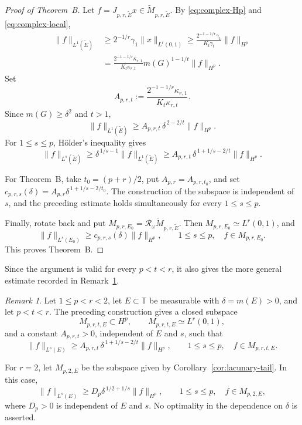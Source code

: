 \documentclass[11pt, reqno]{amsart}
\theoremstyle{definition}
\theoremstyle{remark}
\newtheorem{remark}[theorem]{Remark}
\newcommand{\T}{\mathbb{T}}
\begin{document}
\begin{proof}[Proof of Theorem~B]
Let \(f=J_{p,r,\widetilde E}x\in
\widetilde M_{p,r,\widetilde E}\).  By
\eqref{eq:complex-Hp} and
\eqref{eq:complex-local},
\[
\begin{aligned}
        \|f\|_{L^1(\widetilde E)}
        &\ge
        2^{-1/r}\gamma_1\|x\|_{L^r(0,1)}\ge
        \frac{2^{-1-1/r}\gamma_1}
             {K_t\gamma_t}
        \|f\|_{H^p}\\
        &=
        \frac{2^{-1-1/r}\kappa_{r,1}}
             {K_t\kappa_{r,t}}
        m(G)^{1-1/t}\|f\|_{H^p}.
\end{aligned}
\]
Set
\[
        A_{p,r,t}
        :=
        \frac{2^{-1-1/r}\kappa_{r,1}}
             {K_t\kappa_{r,t}}.
\]
Since \(m(G)\ge\delta^2\) and \(t>1\),
\[
        \|f\|_{L^1(\widetilde E)}
        \ge
        A_{p,r,t}\,\delta^{\,2-2/t}\|f\|_{H^p}.
\]
For \(1\le s\le p\), H\"older's inequality gives
\[
        \|f\|_{L^s(\widetilde E)}
        \ge
        \delta^{\,1/s-1}\|f\|_{L^1(\widetilde E)}  \ge
        A_{p,r,t}\,
        \delta^{\,1+1/s-2/t}\|f\|_{H^p}.
\]

For Theorem~B, take \(t_0=(p+r)/2\), put
\(A_{p,r}=A_{p,r,t_0}\), and set
\(c_{p,r,s}(\delta)
=A_{p,r}\delta^{\,1+1/s-2/t_0}\).
The construction of the subspace is independent of \(s\), and the
preceding estimate holds simultaneously for every \(1\le s\le p\).

Finally, rotate back and put
\(M_{p,r,E_0}
=\mathcal R_\omega\widetilde M_{p,r,\widetilde E}\).
Then \(M_{p,r,E_0}\simeq L^r(0,1)\), and
\[
        \|f\|_{L^s(E_0)}
        \ge
        c_{p,r,s}(\delta)\|f\|_{H^p},
        \qquad
        1\le s\le p,\quad
        f\in M_{p,r,E_0}.
\]
This proves Theorem~B.
\end{proof}


 Since the argument is valid for every
\(p<t<r\), it also gives the more general estimate recorded in
Remark~\ref{rem:local-bound}.


\begin{remark}
\label{rem:local-bound}
Let \(1\le p<r<2\), let \(E\subset\T\) be measurable with
\(\delta=m(E)>0\), and let \(p<t<r\).  The preceding construction
gives a closed subspace
\[
        M_{p,r,t,E}\subset H^p,
        \qquad
        M_{p,r,t,E}\simeq L^r(0,1),
\]
and a constant \(A_{p,r,t}>0\), independent of \(E\) and \(s\), such
that
\[
        \|f\|_{L^s(E)}
        \ge
        A_{p,r,t}\,
        \delta^{\,1+1/s-2/t}
        \|f\|_{H^p},
        \qquad
        1\le s\le p,\quad f\in M_{p,r,t,E}.
\]

For \(r=2\), let \(M_{p,2,E}\) be the subspace given by
Corollary~\ref{cor:lacunary-tail}.  In this case,
\[
        \|f\|_{L^s(E)}
        \ge
        D_p\delta^{\,1/2+1/s}\|f\|_{H^p},
        \qquad
        1\le s\le p,\quad f\in M_{p,2,E},
\]
where \(D_p>0\) is independent of \(E\) and \(s\).  No optimality in the dependence on \(\delta\) is asserted.
\end{remark}
\end{document}
